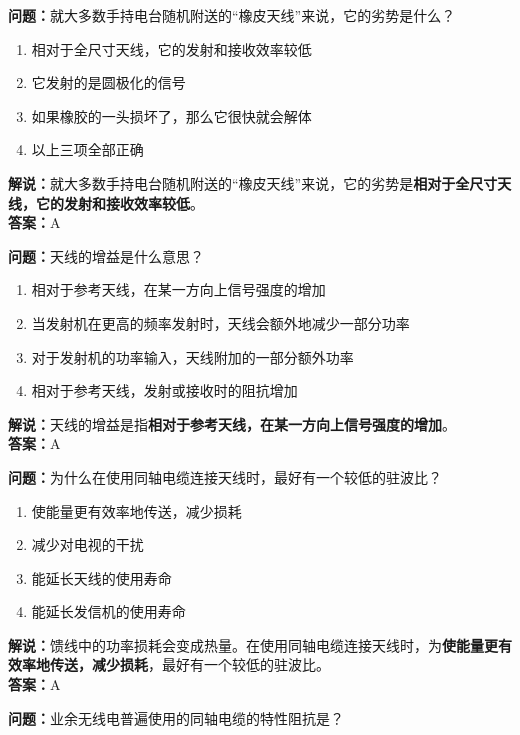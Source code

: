 \textbf{问题：}就大多数手持电台随机附送的“橡皮天线”来说，它的劣势是什么？

\begin{enumerate}[label=\Alph*), leftmargin=1cm]
	\item 相对于全尺寸天线，它的发射和接收效率较低
	\item 它发射的是圆极化的信号
	\item 如果橡胶的一头损坏了，那么它很快就会解体
	\item 以上三项全部正确
\end{enumerate}

\textbf{解说：}就大多数手持电台随机附送的“橡皮天线”来说，它的劣势是\textbf{相对于全尺寸天线，它的发射和接收效率较低}。\\\textbf{答案：}A%



\textbf{问题：}天线的增益是什么意思？

\begin{enumerate}[label=\Alph*), leftmargin=1cm]
	\item 相对于参考天线，在某一方向上信号强度的增加
	\item 当发射机在更高的频率发射时，天线会额外地减少一部分功率
	\item 对于发射机的功率输入，天线附加的一部分额外功率
	\item 相对于参考天线，发射或接收时的阻抗增加
\end{enumerate}

\textbf{解说：}天线的增益是指\textbf{相对于参考天线，在某一方向上信号强度的增加}。\\\textbf{答案：}A%



\textbf{问题：}为什么在使用同轴电缆连接天线时，最好有一个较低的驻波比？

\begin{enumerate}[label=\Alph*), leftmargin=1cm]
	\item 使能量更有效率地传送，减少损耗
	\item 减少对电视的干扰
	\item 能延长天线的使用寿命
	\item 能延长发信机的使用寿命
\end{enumerate}

\textbf{解说：}馈线中的功率损耗会变成热量。在使用同轴电缆连接天线时，为\textbf{使能量更有效率地传送，减少损耗}，最好有一个较低的驻波比。\\\textbf{答案：}A%



\textbf{问题：}业余无线电普遍使用的同轴电缆的特性阻抗是？

